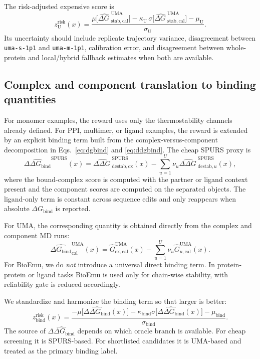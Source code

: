 \documentclass[11pt]{article}
\newcommand{\ddG}{\ensuremath{\Delta\Delta G \ }}
\newcommand{\dG}{\ensuremath{\Delta G \ }}
\newcommand{\ddGbind}{\ensuremath{\Delta\Delta G_{\mathrm{bind}}}}
\newcommand{\dGbind}{\ensuremath{\Delta G_{\mathrm{bind}}}}
\begin{document}
The risk-adjusted expensive score is
\begin{equation}
    z_{\mathrm U}^{\mathrm{risk}}(x)=\frac{\mu\big[\widehat{\dG}^{\mathrm{UMA}}_{\mathrm{stab,cal}}\big]-\kappa_{\mathrm U}\,\sigma\big[\widehat{\dG}^{\mathrm{UMA}}_{\mathrm{stab,cal}}\big]-\mu_{\mathrm U}}{\sigma_{\mathrm U}}.
\end{equation}
Its uncertainty should include replicate trajectory variance, disagreement between \texttt{uma-s-1p1} and \texttt{uma-m-1p1}, calibration error, and disagreement between whole-protein and local/hybrid fallback estimates when both are available.

\subsection{Complex and component translation to binding quantities}

For monomer examples, the reward uses only the thermostability channels already defined. For PPI, multimer, or ligand examples, the reward is extended by an explicit binding term built from the complex-versus-component decomposition in Eqs.~\eqref{eq:dgbind} and \eqref{eq:ddgbind}. The cheap SPURS proxy is
\begin{equation}
\label{eq:spursbind}
    \widehat{\ddGbind}^{\mathrm{SPURS}}(x)=\widehat{\ddG}^{\mathrm{SPURS}}_{\mathrm{destab,cx}}(x)-\sum_{u=1}^{U}\nu_u\widehat{\ddG}^{\mathrm{SPURS}}_{\mathrm{destab},u}(x),
\end{equation}
where the bound-complex score is computed with the partner or ligand context present and the component scores are computed on the separated objects. The ligand-only term is constant across sequence edits and only reappears when absolute $\dGbind$ is reported.

For UMA, the corresponding quantity is obtained directly from the complex and component MD runs:
\begin{equation}
    \widehat{\dGbind}^{\mathrm{UMA}}_{\mathrm{cal}}(x)=\widehat G^{\mathrm{UMA}}_{\mathrm{cx,cal}}(x)-\sum_{u=1}^{U}\nu_u\widehat G^{\mathrm{UMA}}_{u,\mathrm{cal}}(x).
\end{equation}
For BioEmu, we do \emph{not} introduce a universal direct binding term. In protein-protein or ligand tasks BioEmu is used only for chain-wise stability, with reliability gate is reduced accordingly.

We standardize and harmonize the binding term so that larger is better:
\begin{equation}
    z_{\mathrm{bind}}^{\mathrm{risk}}(x)=\frac{-\mu\big[\widehat{\ddGbind}(x)\big]-\kappa_{\mathrm{bind}}\sigma\big[\widehat{\ddGbind}(x)\big]-\mu_{\mathrm{bind}}}{\sigma_{\mathrm{bind}}}.
\end{equation}
The source of $\widehat{\ddGbind}$ depends on which oracle branch is available. For cheap screening it is SPURS-based. For shortlisted candidates it is UMA-based and treated as the primary binding label.
\end{document}

